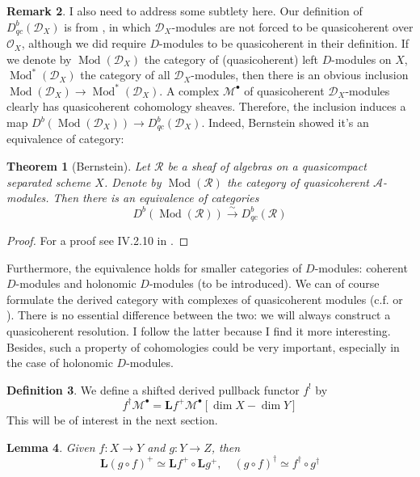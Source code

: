 \documentclass[11pt, a4paper]{article}
\newtheorem{theorem}{Theorem}[subsection]
\newtheorem{lemma}[theorem]{Lemma}
\theoremstyle{definition}
\newtheorem{remark}[theorem]{Remark}
\newtheorem{definition}[theorem]{Definition}
\newcommand{\Mod}{\operatorname{Mod}}
\newcommand{\dL}{\mathbf{L}}
\begin{document}
    \begin{remark}
        I also need to address some subtlety here. Our definition of $D^b_{qc}(\mathcal D_X)$ is from \cite{htt-d-modules}, in which $\mathcal D_X$-modules are not forced to be quasicoherent over $\mathcal O_X$, although we did require $D$-modules to be quasicoherent in their definition. If we denote by $\Mod(\mathcal D_X)$ the category of (quasicoherent) left $D$-modules on $X$, $\Mod^*(\mathcal D_X)$ the category of all $\mathcal D_X$-modules, then there is an obvious inclusion $\Mod(\mathcal D_X)\to \Mod^*(\mathcal D_X)$. A complex $\mathcal M^\bullet$ of quasicoherent $\mathcal D_X$-modules clearly has quasicoherent cohomology sheaves. Therefore, the inclusion induces a map $D^b(\Mod(\mathcal D_X))\to D^b_{qc}(\mathcal D_X)$. Indeed, Bernstein showed it's an equivalence of category:
        \begin{theorem}[Bernstein]\label{thm-bernstein}
            Let $\mathcal R$ be a sheaf of algebras on a quasicompact separated scheme $X$. Denote by $\Mod(\mathcal R)$ the category of quasicoherent $\mathcal A$-modules. Then there is an equivalence of categories
            \[D^b(\Mod(\mathcal R))\xrightarrow{\sim}D^b_{qc}(\mathcal R)\]
        \end{theorem}
        \begin{proof}
            For a proof see IV.2.10 in \cite{borel-d-modules}.
        \end{proof}
        Furthermore, the equivalence holds for smaller categories of $D$-modules: coherent $D$-modules and holonomic $D$-modules (to be introduced). We can of course formulate the derived category with complexes of quasicoherent modules (c.f. \cite{ginzburg-notes} or \cite{bernstein-notes}). There is no essential difference between the two: we will always construct a quasicoherent resolution. I follow the latter because I find it more interesting. Besides, such a property of cohomologies could be very important, especially in the case of holonomic $D$-modules.
    \end{remark}
    \begin{definition}
        We define a shifted derived pullback functor $f^!$ by
        \[f^\dagger\mathcal M^\bullet=\dL f^+\mathcal M^\bullet[\dim X-\dim Y]\]
        This will be of interest in the next section.
    \end{definition}
    \begin{lemma}\label{lem-pullback-natural}
        Given $f:X\to Y$ and $g:Y\to Z$, then
        \[\dL (g\circ f)^+\simeq \dL f^+\circ\dL g^+,\quad (g\circ f)^\dagger\simeq f^\dagger\circ g^\dagger\]
    \end{lemma}
\end{document}
